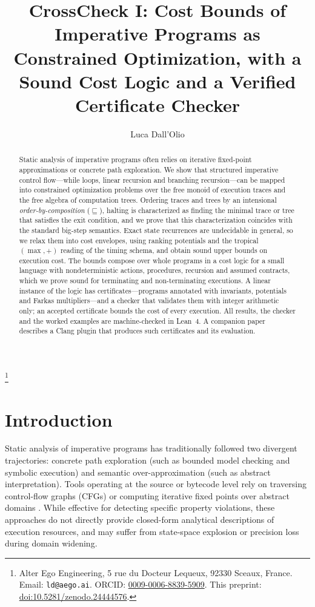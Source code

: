 \documentclass[oneside,english]{amsart}
\numberwithin{equation}{section}
\numberwithin{figure}{section}
\theoremstyle{plain}
\theoremstyle{definition}
\theoremstyle{plain}
\theoremstyle{remark}
\theoremstyle{plain}
\theoremstyle{definition}
\theoremstyle{plain}
\theoremstyle{remark}
\begin{document}
\title[CrossCheck I: Cost Bounds as Constrained Optimization]{CrossCheck I: Cost Bounds of Imperative Programs as Constrained Optimization, with a Sound Cost Logic and a Verified Certificate Checker}
\author{Luca Dall'Olio}
\thanks{Alter Ego Engineering, 5 rue du Docteur Lequeux, 92330 Sceaux, France. Email: \texttt{ld@aego.ai}. ORCID: \href{https://orcid.org/0009-0006-8839-5909}{0009-0006-8839-5909}. This preprint: \href{https://doi.org/10.5281/zenodo.24444576}{doi:10.5281/zenodo.24444576}.}
\begin{abstract}
Static analysis of imperative programs often relies on iterative fixed-point approximations or concrete path exploration. We show that structured imperative control flow---while loops, linear recursion and branching recursion---can be mapped into constrained optimization problems over the free monoid of execution traces and the free algebra of computation trees. Ordering traces and trees by an intensional \textit{order-by-composition} ($\sqsubseteq$), halting is characterized as finding the minimal trace or tree that satisfies the exit condition, and we prove that this characterization coincides with the standard big-step semantics. Exact state recurrences are undecidable in general, so we relax them into cost envelopes, using ranking potentials and the tropical $(\max,+)$ reading of the timing schema, and obtain sound upper bounds on execution cost. The bounds compose over whole programs in a cost logic for a small language with nondeterministic actions, procedures, recursion and assumed contracts, which we prove sound for terminating and non-terminating executions. A linear instance of the logic has certificates---programs annotated with invariants, potentials and Farkas multipliers---and a checker that validates them with integer arithmetic only; an accepted certificate bounds the cost of every execution. All results, the checker and the worked examples are machine-checked in Lean~4. A companion paper describes a Clang plugin that produces such certificates and its evaluation.
\end{abstract}

\maketitle

\section{Introduction}

Static analysis of imperative programs has traditionally followed two divergent trajectories:
concrete path exploration (such as bounded model checking and symbolic execution) and semantic
over-approximation (such as abstract interpretation). Tools operating at the source or bytecode level
rely on traversing control-flow graphs (CFGs) or computing iterative fixed points over abstract
domains \cite{cousot1977abstract}. While effective for detecting specific property violations,
these approaches do not directly provide closed-form analytical descriptions of execution resources,
and may suffer from state-space explosion or precision loss during domain widening.
\end{document}
